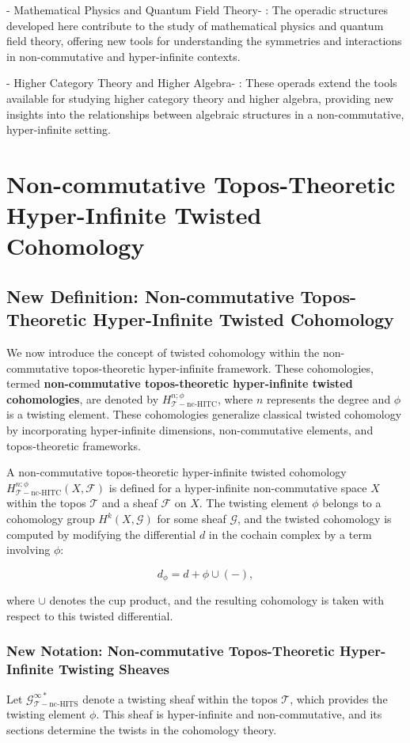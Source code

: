 \documentclass{article}
\begin{document}
-  Mathematical Physics and Quantum Field Theory- : The operadic structures developed here contribute to the study of mathematical physics and quantum field theory, offering new tools for understanding the symmetries and interactions in non-commutative and hyper-infinite contexts.

-  Higher Category Theory and Higher Algebra- : These operads extend the tools available for studying higher category theory and higher algebra, providing new insights into the relationships between algebraic structures in a non-commutative, hyper-infinite setting.



\section{Non-commutative Topos-Theoretic Hyper-Infinite Twisted Cohomology}
\subsection{New Definition: Non-commutative Topos-Theoretic Hyper-Infinite Twisted Cohomology}
We now introduce the concept of twisted cohomology within the non-commutative topos-theoretic hyper-infinite framework. These cohomologies, termed \textbf{non-commutative topos-theoretic hyper-infinite twisted cohomologies}, are denoted by \(H_{\mathcal{T}-\text{nc-HITC}}^{n; \phi}\), where \(n\) represents the degree and \(\phi\) is a twisting element. These cohomologies generalize classical twisted cohomology by incorporating hyper-infinite dimensions, non-commutative elements, and topos-theoretic frameworks.

A non-commutative topos-theoretic hyper-infinite twisted cohomology \(H_{\mathcal{T}-\text{nc-HITC}}^{n; \phi}(X, \mathcal{F})\) is defined for a hyper-infinite non-commutative space \(X\) within the topos \(\mathcal{T}\) and a sheaf \(\mathcal{F}\) on \(X\). The twisting element \(\phi\) belongs to a cohomology group \(H^k(X, \mathcal{G})\) for some sheaf \(\mathcal{G}\), and the twisted cohomology is computed by modifying the differential \(d\) in the cochain complex by a term involving \(\phi\):

\[
d_{\phi} = d + \phi \cup (-),
\]

where \(\cup\) denotes the cup product, and the resulting cohomology is taken with respect to this twisted differential.

\subsubsection{New Notation: Non-commutative Topos-Theoretic Hyper-Infinite Twisting Sheaves}
Let \(\mathcal{G}_{\mathcal{T}-\text{nc-HITS}}^{\infty *}\) denote a twisting sheaf within the topos \(\mathcal{T}\), which provides the twisting element \(\phi\). This sheaf is hyper-infinite and non-commutative, and its sections determine the twists in the cohomology theory.
\end{document}
